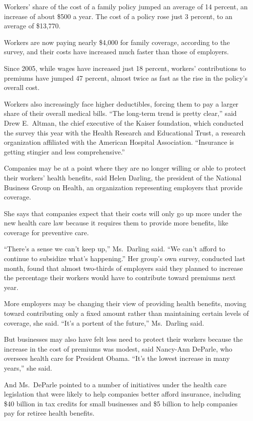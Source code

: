 ﻿\documentclass[12pt]{article}
\begin{document}
Workers' share of the cost of a family policy jumped an average of 14 percent, an increase of about
\$500 a year. The cost of a policy rose just 3 percent, to an average of \$13,770.

Workers are now paying nearly \$4,000 for family coverage, according to the survey, and their costs
have increased much faster than those of employers.

Since 2005, while wages have increased just 18 percent, workers' contributions to premiums have
jumped 47 percent, almost twice as fast as the rise in the policy's overall cost.

Workers also increasingly face higher deductibles, forcing them to pay a larger share of their
overall medical bills. ``The long-term trend is pretty clear,'' said Drew E.~Altman, the chief
executive of the Kaiser foundation, which conducted the survey this year with the Health Research
and Educational Trust, a research organization affiliated with the American Hospital Association.
``Insurance is getting stingier and less comprehensive.''

Companies may be at a point where they are no longer willing or able to protect their workers'
health benefits, said Helen Darling, the president of the National Business Group on Health, an
organization representing employers that provide coverage.

She says that companies expect that their costs will only go up more under the new health care law
because it requires them to provide more benefits, like coverage for preventive care.

``There's a sense we can't keep up,'' Ms.~Darling said. ``We can't afford to continue to subsidize
what's happening.'' Her group's own survey, conducted last month, found that almost two-thirds of
employers said they planned to increase the percentage their workers would have to contribute toward
premiums next year.

More employers may be changing their view of providing health benefits, moving toward contributing
only a fixed amount rather than maintaining certain levels of coverage, she said. ``It's a portent
of the future,'' Ms.~Darling said.

But businesses may also have felt less need to protect their workers because the increase in the
cost of premiums was modest, said Nancy-Ann DeParle, who oversees health care for President Obama.
``It's the lowest increase in many years,'' she said.

And Ms.~DeParle pointed to a number of initiatives under the health care legislation that were
likely to help companies better afford insurance, including \$40 billion in tax credits for small
businesses and \$5 billion to help companies pay for retiree health benefits.
\end{document}

